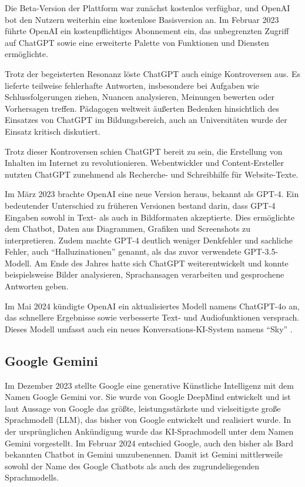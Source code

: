 Die Beta-Version der Plattform war zunächst kostenlos verfügbar, und OpenAI bot den Nutzern weiterhin eine kostenlose 
Basisversion an. Im Februar 2023 führte OpenAI ein kostenpflichtiges Abonnement ein, das unbegrenzten Zugriff auf ChatGPT 
sowie eine erweiterte Palette von Funktionen und Diensten ermöglichte.

Trotz der begeisterten Resonanz löste ChatGPT auch einige Kontroversen aus. Es lieferte teilweise fehlerhafte Antworten, 
insbesondere bei Aufgaben wie Schlussfolgerungen ziehen, Nuancen analysieren, Meinungen bewerten oder Vorhersagen treffen. 
Pädagogen weltweit äußerten Bedenken hinsichtlich des Einsatzes von ChatGPT im Bildungsbereich, auch an Universitäten wurde 
der Einsatz kritisch diskutiert.

Trotz dieser Kontroversen schien ChatGPT bereit zu sein, die Erstellung von Inhalten im Internet zu revolutionieren. 
Webentwickler und Content-Ersteller nutzten ChatGPT zunehmend als Recherche- und Schreibhilfe für Website-Texte.

Im März 2023 brachte OpenAI eine neue Version heraus, bekannt als GPT-4. Ein bedeutender Unterschied zu früheren Versionen 
bestand darin, dass GPT-4 Eingaben sowohl in Text- als auch in Bildformaten akzeptierte. Dies ermöglichte dem Chatbot, Daten 
aus Diagrammen, Grafiken und Screenshots zu interpretieren. Zudem machte GPT-4 deutlich weniger Denkfehler und sachliche Fehler, 
auch ``Halluzinationen'' genannt, als das zuvor verwendete GPT-3.5-Modell. Am Ende des Jahres hatte sich ChatGPT weiterentwickelt 
und konnte beispielsweise Bilder analysieren, Sprachansagen verarbeiten und gesprochene Antworten geben.

Im Mai 2024 kündigte OpenAI ein aktualisiertes Modell namens ChatGPT-4o an, das schnellere Ergebnisse sowie verbesserte 
Text- und Audiofunktionen versprach. Dieses Modell umfasst auch ein neues Konversations-KI-System namens ``Sky'' \cite{GrundlagenChatGPT}.

\subsection{Google Gemini}  \label{Google Gemini}

Im Dezember 2023 stellte Google eine generative Künstliche Intelligenz mit dem Namen Google Gemini vor. Sie wurde von Google DeepMind 
entwickelt und ist laut Aussage von Google das größte, leistungsstärkste und vielseitigste große Sprachmodell (LLM), das bisher von 
Google entwickelt und realisiert wurde. In der ursprünglichen Ankündigung wurde das KI-Sprachmodell unter dem Namen Gemini vorgestellt. 
Im Februar 2024 entschied Google, auch den bisher als Bard bekannten Chatbot in Gemini umzubenennen. Damit ist Gemini mittlerweile sowohl
der Name des Google Chatbots als auch des zugrundeliegenden Sprachmodells.

